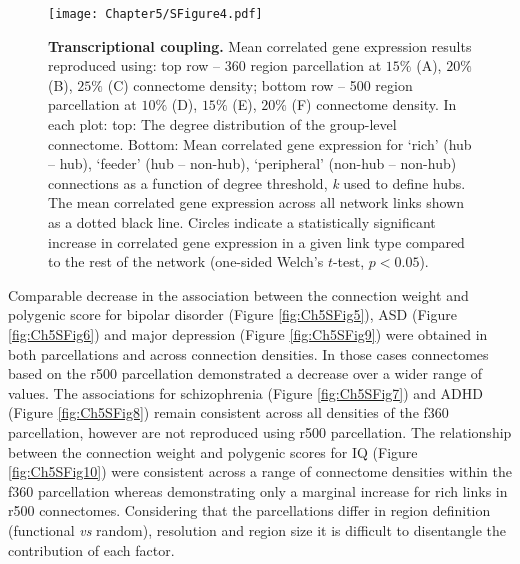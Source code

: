 \begin{figure}[h!]
\begin{center}
\texttt{[image: Chapter5/SFigure4.pdf]}%
\end{center}
\caption{\textbf{Transcriptional coupling.} 
Mean correlated gene expression results reproduced using: top row -- 360 region parcellation at $15\%$ (A), $20\%$ (B), $25\%$ (C) connectome density; bottom row -- 500 region parcellation at $10\%$ (D), $15\%$ (E), $20\%$ (F) connectome density. In each plot: top: The degree distribution of the group-level connectome. Bottom: Mean correlated gene expression for `rich' (hub -- hub), `feeder' (hub -- non-hub), `peripheral' (non-hub -- non-hub) connections as a function of degree threshold, \textit{k} used to define hubs. The mean correlated gene expression across all network links shown as a dotted black line. Circles indicate a statistically significant increase in correlated gene expression in a given link type compared to the rest of the network (one-sided Welch's $t$-test, $p < 0.05$).}
\label{fig:Ch5SFig4}
\end{figure}

\clearpage
Comparable decrease in the association between the connection weight and polygenic score for bipolar disorder (Figure \ref{fig:Ch5SFig5}), ASD (Figure \ref{fig:Ch5SFig6}) and major depression (Figure \ref{fig:Ch5SFig9}) were obtained in both parcellations and across connection densities. In those cases connectomes based on the r500 parcellation demonstrated a decrease over a wider range of values. The associations for schizophrenia (Figure \ref{fig:Ch5SFig7}) and ADHD (Figure \ref{fig:Ch5SFig8}) remain consistent across all densities of the f360 parcellation, however are not reproduced using r500 parcellation. The relationship between the connection weight and polygenic scores for IQ (Figure \ref{fig:Ch5SFig10}) were consistent across a range of connectome densities within the f360 parcellation whereas demonstrating only a marginal increase for rich links in r500 connectomes. Considering that the parcellations differ in region definition (functional \textit{vs} random), resolution and region size it is difficult to disentangle the contribution of each factor. 

